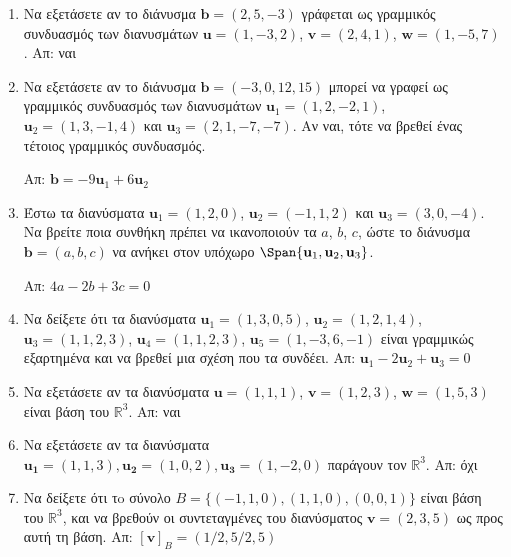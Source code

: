 \documentclass[a4paper,table]{report}
\begin{document}
\begin{enumerate}
  \item\label{ask:eksart2} Να εξετάσετε αν το διάνυσμα $ \mathbf{b} = (2,5,-3) $ 
    γράφεται ως γραμμικός συνδυασμός των διανυσμάτων $ \mathbf{u} = (1,-3,2)$, 
    $ \mathbf{v} = (2,4,1)$, $ \mathbf{w} = (1,-5,7) $.
    \hfill Απ: ναι 

  \item Να εξετάσετε αν το διάνυσμα $ \mathbf{b} = (-3,0,12,15) $ μπορεί να γραφεί 
    ως γραμμικός συνδυασμός των διανυσμάτων $ \mathbf{u}_{1} = (1,2,-2,1) $, 
    $ \mathbf{u}_{2} = (1,3,-1,4) $ και $ \mathbf{u}_{3} = (2,1,-7,-7) $. 
    Αν ναι, τότε να βρεθεί ένας τέτοιος γραμμικός συνδυασμός.

    \hfill Απ: $ \mathbf{b} = -9 \mathbf{u}_{1} + 6 \mathbf{u}_{2} $ 

  \item\label{ask:eksart3} Έστω τα διανύσματα $ \mathbf{u}_{1} = (1,2,0) $, 
    $ \mathbf{u}_{2} = (-1,1,2) $ 
    και $ \mathbf{u}_{3} = (3,0,-4) $. Να βρείτε ποια συνθήκη πρέπει να ικανοποιούν τα 
    $a$, $b$, $c$, ώστε το διάνυσμα $ \mathbf{b} = (a,b,c) $ να ανήκει στον υπόχωρο 
    $ \Span \{ \mathbf{u}_{1}, \mathbf{u}_{2}, \mathbf{u}_{3} \} $.

    \hfill Απ: $ 4a -2b + 3c = 0 $ 

  \item\label{ask:synd} Να δείξετε ότι τα διανύσματα $ \mathbf{u}_{1} = (1,3,0,5) $, 
    $ \mathbf{u}_{2} = (1,2,1,4) $, $ \mathbf{u}_{3} = (1,1,2,3)$, 
    $ \mathbf{u}_{4} = (1,1,2,3) $, $ \mathbf{u}_{5} = (1,-3,6,-1) $ 
    είναι γραμμικώς εξαρτημένα και να βρεθεί μια σχέση που τα συνδέει. 
    \hfill Απ: $ \mathbf{u}_{1} - 2 \mathbf{u}_{2} + \mathbf{u}_{3} = 0 $ 

  \item\label{ask:baseeks} Να εξετάσετε αν τα διανύσματα $ \mathbf{u} = (1,1,1)$, 
    $ \mathbf{v} = (1,2,3)$, $ \mathbf{w} = (1,5,3) $ είναι βάση του $\mathbb{R}^{3}$. 
    \hfill Απ: ναι 

  \item\label{ask:parag} Να εξετάσετε αν τα διανύσματα $ \mathbf{u_{1}} = (1,1,3), 
    \mathbf{u_{2}} = (1,0,2), \mathbf{u_{3}}= (1,-2,0)$ παράγουν τον $ \mathbb{R}^{3} $.
    \hfill Απ: όχι 

  \item Να δείξετε ότι τo σύνολο $ B = \{ (-1,1,0), (1,1,0), 
    (0,0,1) \} $ είναι βάση του 
    $ \mathbb{R}^{3} $, και να βρεθούν οι συντεταγμένες του διανύσματος 
    $ \mathbf{v} = (2,3,5) $ ως προς αυτή τη βάση.
    \hfill Απ: $ [\mathbf{v}]_{B} = (1/2,5/2,5) $ 


\end{enumerate}
\end{document}

